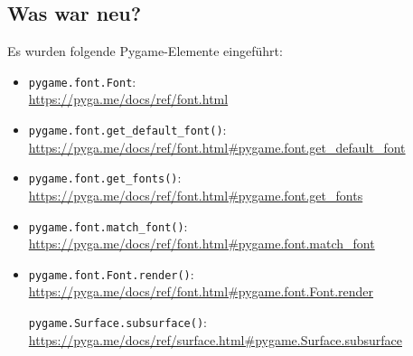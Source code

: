 \subsection*{Was war neu?}

Es wurden folgende Pygame-Elemente eingeführt:

\begin{itemize}
	\item \texttt{pygame.font.Font}:
	\\ \url{https://pyga.me/docs/ref/font.html}
	
	\item \texttt{pygame.font.get\_default\_font()}:
	\\ \url{https://pyga.me/docs/ref/font.html#pygame.font.get_default_font}

	\item \texttt{pygame.font.get\_fonts()}:
	\\ \url{https://pyga.me/docs/ref/font.html#pygame.font.get_fonts}
	
    \item \texttt{pygame.font.match\_font()}:
    \\
    \url{https://pyga.me/docs/ref/font.html#pygame.font.match_font}

	\item \texttt{pygame.font.Font.render()}:
    \\ \url{https://pyga.me/docs/ref/font.html#pygame.font.Font.render}

	\texttt{pygame.Surface.subsurface()}:
    \\ \url{https://pyga.me/docs/ref/surface.html#pygame.Surface.subsurface}


\end{itemize}
